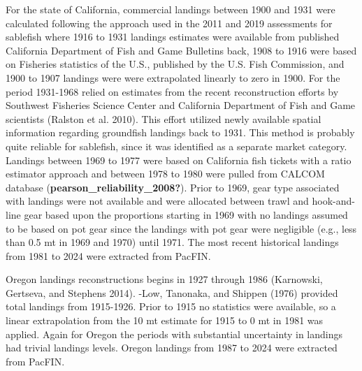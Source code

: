 \documentclass[
]{scrartcl}
\begin{document}
For the state of California, commercial landings between 1900 and 1931
were calculated following the approach used in the 2011 and 2019
assessments for sablefish where 1916 to 1931 landings estimates were
available from published California Department of Fish and Game
Bulletins back, 1908 to 1916 were based on Fisheries statistics of the
U.S., published by the U.S. Fish Commission, and 1900 to 1907 landings
were were extrapolated linearly to zero in 1900. For the period
1931-1968 relied on estimates from the recent reconstruction efforts by
Southwest Fisheries Science Center and California Department of Fish and
Game scientists (Ralston et al. 2010). This effort utilized newly
available spatial information regarding groundfish landings back to
1931. This method is probably quite reliable for sablefish, since it was
identified as a separate market category. Landings between 1969 to 1977
were based on California fish tickets with a ratio estimator approach
and between 1978 to 1980 were pulled from CALCOM database
(\textbf{pearson\_reliability\_2008?}). Prior to 1969, gear type
associated with landings were not available and were allocated between
trawl and hook-and-line gear based upon the proportions starting in 1969
with no landings assumed to be based on pot gear since the landings with
pot gear were negligible (e.g., less than 0.5 mt in 1969 and 1970) until
1971. The most recent historical landings from 1981 to 2024 were
extracted from PacFIN.

Oregon landings reconstructions begins in 1927 through 1986 (Karnowski,
Gertseva, and Stephens 2014). -Low, Tanonaka, and Shippen (1976)
provided total landings from 1915-1926. Prior to 1915 no statistics were
available, so a linear extrapolation from the 10 mt estimate for 1915 to
0 mt in 1981 was applied. Again for Oregon the periods with substantial
uncertainty in landings had trivial landings levels. Oregon landings
from 1987 to 2024 were extracted from PacFIN.
\end{document}
